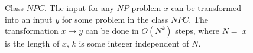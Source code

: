 \begin{figure}
\centering



\caption{Class $NPC$. The input for any $NP$ problem $x$ can be
  transformed into an input $y$ for some problem in the class
  $NPC$. The transformation $x \rightarrow y$ can be done in 
  $O\left(N^k\right)$ steps, where $N = \left|x\right|$ is the length of $x$, $k$
  is some integer independent of $N$.
} 
\label{figAddAlgoNPC}
\end{figure}